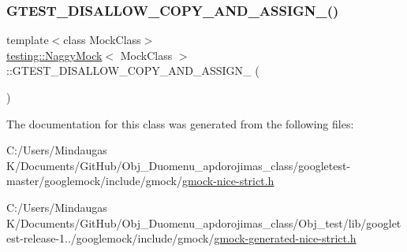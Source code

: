 \mbox{\label{classtesting_1_1_naggy_mock_af3b39b4a100fa43787c647fd9dbf30a8}} 
\subsubsection{\texorpdfstring{GTEST\_DISALLOW\_COPY\_AND\_ASSIGN\_()}{GTEST\_DISALLOW\_COPY\_AND\_ASSIGN\_()}\hspace{0.1cm}{\footnotesize\ttfamily [3/3]}}
{\footnotesize\ttfamily template$<$class Mock\+Class$>$ \\
\mbox{\hyperlink{classtesting_1_1_naggy_mock}{testing\+::\+Naggy\+Mock}}$<$ Mock\+Class $>$\+::G\+T\+E\+S\+T\+\_\+\+D\+I\+S\+A\+L\+L\+O\+W\+\_\+\+C\+O\+P\+Y\+\_\+\+A\+N\+D\+\_\+\+A\+S\+S\+I\+G\+N\+\_\+ (\begin{DoxyParamCaption}\item[{\mbox{\hyperlink{classtesting_1_1_naggy_mock}{Naggy\+Mock}}$<$ Mock\+Class $>$}]{ }\end{DoxyParamCaption})\hspace{0.3cm}{\ttfamily [private]}}



The documentation for this class was generated from the following files\+:\begin{DoxyCompactItemize}
\item 
C\+:/\+Users/\+Mindaugas K/\+Documents/\+Git\+Hub/\+Obj\+\_\+\+Duomenu\+\_\+apdorojimas\+\_\+class/googletest-\/master/googlemock/include/gmock/\mbox{\hyperlink{googletest-master_2googlemock_2include_2gmock_2gmock-nice-strict_8h}{gmock-\/nice-\/strict.\+h}}\item 
C\+:/\+Users/\+Mindaugas K/\+Documents/\+Git\+Hub/\+Obj\+\_\+\+Duomenu\+\_\+apdorojimas\+\_\+class/\+Obj\+\_\+test/lib/googletest-\/release-\/1../googlemock/include/gmock/\mbox{\hyperlink{gmock-generated-nice-strict_8h}{gmock-\/generated-\/nice-\/strict.\+h}}\end{DoxyCompactItemize}
